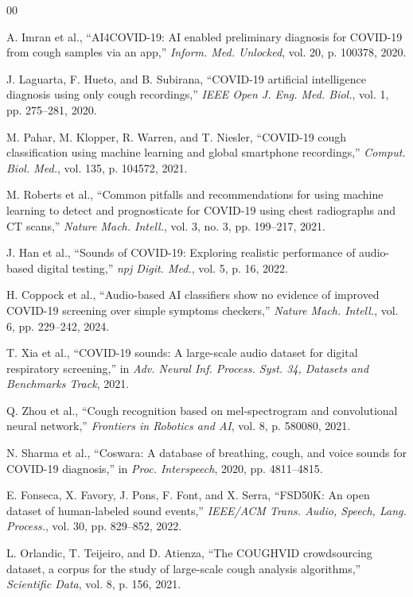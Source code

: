 \documentclass{ieeeaccess}
\begin{document}
\begin{thebibliography}{00}

A. Imran et al., ``AI4COVID-19: AI enabled preliminary diagnosis for COVID-19 from cough samples via an app,'' \emph{Inform. Med. Unlocked}, vol. 20, p. 100378, 2020.

J. Laguarta, F. Hueto, and B. Subirana, ``COVID-19 artificial intelligence diagnosis using only cough recordings,'' \emph{IEEE Open J. Eng. Med. Biol.}, vol. 1, pp. 275--281, 2020.

M. Pahar, M. Klopper, R. Warren, and T. Niesler, ``COVID-19 cough classification using machine learning and global smartphone recordings,'' \emph{Comput. Biol. Med.}, vol. 135, p. 104572, 2021.

M. Roberts et al., ``Common pitfalls and recommendations for using machine learning to detect and prognosticate for COVID-19 using chest radiographs and CT scans,'' \emph{Nature Mach. Intell.}, vol. 3, no. 3, pp. 199--217, 2021.

J. Han et al., ``Sounds of COVID-19: Exploring realistic performance of audio-based digital testing,'' \emph{npj Digit. Med.}, vol. 5, p. 16, 2022.

H. Coppock et al., ``Audio-based AI classifiers show no evidence of improved COVID-19 screening over simple symptoms checkers,'' \emph{Nature Mach. Intell.}, vol. 6, pp. 229--242, 2024.

T. Xia et al., ``COVID-19 sounds: A large-scale audio dataset for digital respiratory screening,'' in \emph{Adv. Neural Inf. Process. Syst. 34, Datasets and Benchmarks Track}, 2021.

Q. Zhou et al., ``Cough recognition based on mel-spectrogram and convolutional neural network,'' \emph{Frontiers in Robotics and AI}, vol. 8, p. 580080, 2021.

N. Sharma et al., ``Coswara: A database of breathing, cough, and voice sounds for COVID-19 diagnosis,'' in \emph{Proc. Interspeech}, 2020, pp. 4811--4815.

E. Fonseca, X. Favory, J. Pons, F. Font, and X. Serra, ``FSD50K: An open dataset of human-labeled sound events,'' \emph{IEEE/ACM Trans. Audio, Speech, Lang. Process.}, vol. 30, pp. 829--852, 2022.

L. Orlandic, T. Teijeiro, and D. Atienza, ``The COUGHVID crowdsourcing dataset, a corpus for the study of large-scale cough analysis algorithms,'' \emph{Scientific Data}, vol. 8, p. 156, 2021.


\end{thebibliography}
\end{document}
